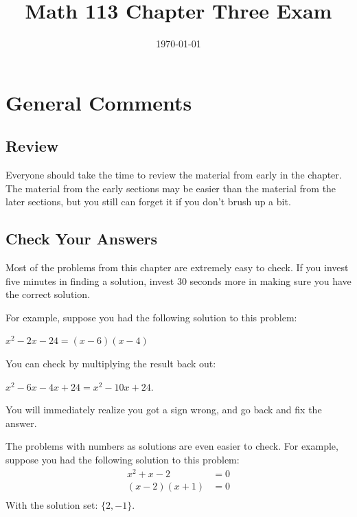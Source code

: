 \documentclass[fleqn,addpoints]{exam}
\title{Math 113 Chapter Three Exam}
\author{}
\date{\today}
\begin{document}
\maketitle

\ifprintanswers
\else
\vspace{0.2in}
\vspace{0.2in}

\begin{center}
\gradetable[h][pages]
\end{center}

\fi

\ifprintanswers
\section{General Comments}

\subsection{Review}
Everyone should take the time to review the material from early in the chapter.  The material from the early sections
may be easier than the material from the later sections, but you still can forget it if you don't brush up a bit.

\subsection{Check Your Answers}
Most of the problems from this chapter are extremely easy to check.  If you invest five minutes in
finding a solution, invest 30 seconds more in making sure you have the correct solution.  

For example, suppose you had the following solution to this problem: 

\( x^2 - 2x - 24 = (x - 6)(x - 4) \)

You can check by multiplying the result back out: 

$x^2 - 6x - 4x + 24 = x^2 - 10x + 24$.

You will immediately realize you got a sign wrong, and go back and fix the answer.

The problems with numbers as solutions are even easier to check. For example, suppose you had the following solution to
this problem:
\begin{align*}  
  x^2 + x - 2 &= 0 \\
  (x - 2)(x + 1)  &= 0 \\
\end{align*}
With the solution set: $\{2, -1\}$.
  
\end{document}
